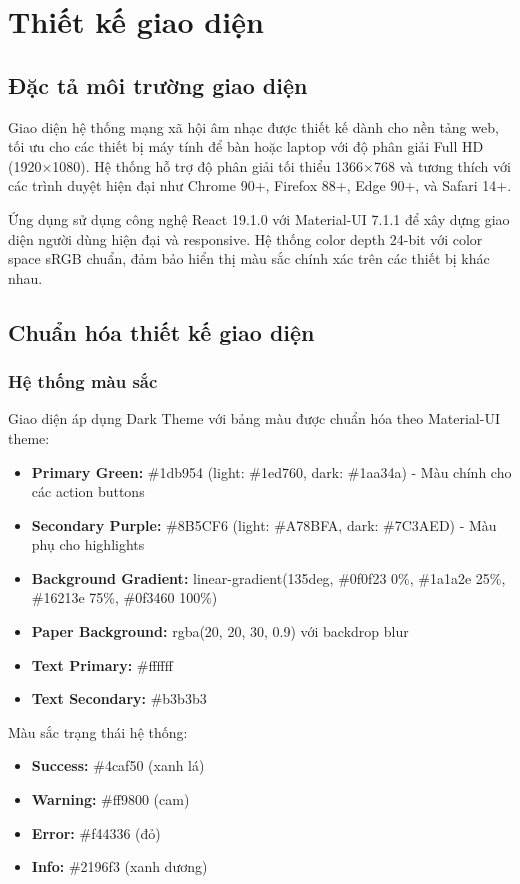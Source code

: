 \section{Thiết kế giao diện}

\subsection{Đặc tả môi trường giao diện}

Giao diện hệ thống mạng xã hội âm nhạc được thiết kế dành cho nền tảng web, tối ưu cho các thiết bị máy tính để bàn hoặc laptop với độ phân giải Full HD (1920×1080). Hệ thống hỗ trợ độ phân giải tối thiểu 1366×768 và tương thích với các trình duyệt hiện đại như Chrome 90+, Firefox 88+, Edge 90+, và Safari 14+.

Ứng dụng sử dụng công nghệ React 19.1.0 với Material-UI 7.1.1 để xây dựng giao diện người dùng hiện đại và responsive. Hệ thống color depth 24-bit với color space sRGB chuẩn, đảm bảo hiển thị màu sắc chính xác trên các thiết bị khác nhau.

\subsection{Chuẩn hóa thiết kế giao diện}

\subsubsection{Hệ thống màu sắc}

Giao diện áp dụng Dark Theme với bảng màu được chuẩn hóa theo Material-UI theme:
\begin{itemize}
    \item \textbf{Primary Green:} \#1db954 (light: \#1ed760, dark: \#1aa34a) - Màu chính cho các action buttons
    \item \textbf{Secondary Purple:} \#8B5CF6 (light: \#A78BFA, dark: \#7C3AED) - Màu phụ cho highlights
    \item \textbf{Background Gradient:} linear-gradient(135deg, \#0f0f23 0\%, \#1a1a2e 25\%, \#16213e 75\%, \#0f3460 100\%)
    \item \textbf{Paper Background:} rgba(20, 20, 30, 0.9) với backdrop blur
    \item \textbf{Text Primary:} \#ffffff
    \item \textbf{Text Secondary:} \#b3b3b3
\end{itemize}

Màu sắc trạng thái hệ thống:
\begin{itemize}
    \item \textbf{Success:} \#4caf50 (xanh lá)
    \item \textbf{Warning:} \#ff9800 (cam)
    \item \textbf{Error:} \#f44336 (đỏ)
    \item \textbf{Info:} \#2196f3 (xanh dương)
\end{itemize}

